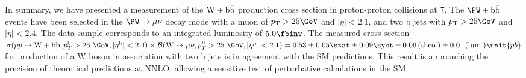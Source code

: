 

In summary, we have presented a measurement of the $\mathrm{W+\mathrm{b\bar{b}}}$ production
cross section in proton-proton collisions at 7\TeV. The $\PW+\bbbar$ events
have been  selected in the $\PW \to \mu\nu$ decay mode with a 
muon of $\pt>25\GeV$ and $|\eta|<2.1$, and two b jets with $\pt>25\GeV$ and $|\eta|<2.4$. 
The data sample corresponds to an integrated luminosity of $5.0\fbinv$.
The measured cross section 
$\sigma(pp\rightarrow \mathrm{W} + \bbbar, p_T^{\mathrm{b}}>25~\GeV, |\eta^{\mathrm{b}}|<2.4)\times {\cal{B}}(\Wmn, p_T^{\mu}>25~\GeV, |\eta^{\mu}|<2.1) =0.53\pm  0.05\stat \pm 0.09 \syst \pm 0.06 \theo \pm 0.01\lumi \unit{pb}$
for production of a W boson in association with two b jets is in agreement with
the SM predictions.
This result is approaching the precision of theoretical predictions at NNLO, 
allowing a sensitive test of perturbative calculations
in the SM.



